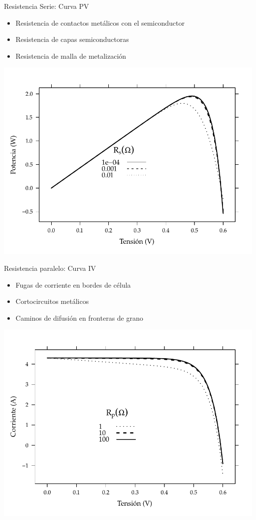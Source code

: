 \documentclass[xcolor={usenames,svgnames,dvipsnames}]{beamer}
\begin{document}
\begin{frame}[label=sec-3-3-3]{Resistencia Serie: Curva PV}
\begin{itemize}
\item Resistencia de contactos metálicos con el semiconductor

\item Resistencia de capas semiconductoras

\item Resistencia de malla de metalización
\end{itemize}

\includegraphics[width=.9\linewidth]{../figs/InfluenciaRs_Potencia.pdf}
\end{frame}

\begin{frame}[label=sec-3-3-4]{Resistencia paralelo: Curva IV}
\begin{itemize}
\item Fugas de corriente en bordes de célula

\item Cortocircuitos metálicos

\item Caminos de difusión en fronteras de grano
\end{itemize}

\includegraphics[width=.9\linewidth]{../figs/InfluenciaRsh_IV.pdf}
\end{frame}
\end{document}
